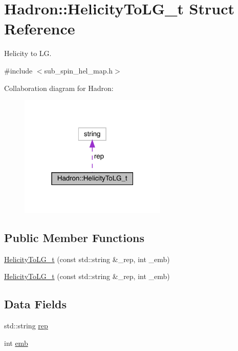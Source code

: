 \hypertarget{structHadron_1_1HelicityToLG__t}{}\section{Hadron\+:\+:Helicity\+To\+L\+G\+\_\+t Struct Reference}
\label{structHadron_1_1HelicityToLG__t}


Helicity to LG.  




{\ttfamily \#include $<$sub\+\_\+spin\+\_\+hel\+\_\+map.\+h$>$}



Collaboration diagram for Hadron\+:\nopagebreak
\begin{figure}[H]
\begin{center}
\leavevmode
\includegraphics[width=199pt]{d8/d52/structHadron_1_1HelicityToLG__t__coll__graph}
\end{center}
\end{figure}
\subsection*{Public Member Functions}
\begin{DoxyCompactItemize}
\item 
\mbox{\hyperlink{structHadron_1_1HelicityToLG__t_a169aa4cb0f221e29db87c404f56eacf6}{Helicity\+To\+L\+G\+\_\+t}} (const std\+::string \&\+\_\+rep, int \+\_\+emb)
\item 
\mbox{\hyperlink{structHadron_1_1HelicityToLG__t_a169aa4cb0f221e29db87c404f56eacf6}{Helicity\+To\+L\+G\+\_\+t}} (const std\+::string \&\+\_\+rep, int \+\_\+emb)
\end{DoxyCompactItemize}
\subsection*{Data Fields}
\begin{DoxyCompactItemize}
\item 
std\+::string \mbox{\hyperlink{structHadron_1_1HelicityToLG__t_a49a6869a62bf38d55a2cf332750bf365}{rep}}
\item 
int \mbox{\hyperlink{structHadron_1_1HelicityToLG__t_aa2343a2515755f6a1bc6cf802e12a183}{emb}}
\end{DoxyCompactItemize}


